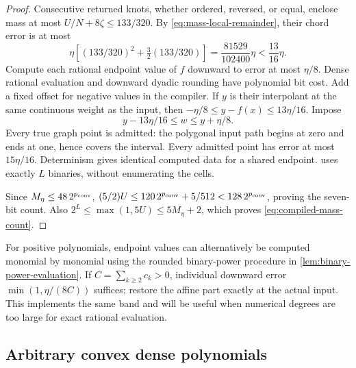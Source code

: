 \begin{proof}
Consecutive returned knots, whether ordered, reversed, or equal, enclose
mass at most $U/N+8\zeta\le133/320$. By
\eqref{eq:mass-local-remainder}, their chord error is at most
\[
 \eta\left[(133/320)^2+\tfrac32(133/320)\right]
 =\frac{81529}{102400}\eta<\frac{13}{16}\eta.
\]
Compute each rational endpoint value of $f$ downward to error at most
$\eta/8$. Dense rational evaluation and downward dyadic rounding have
polynomial bit cost. Add a fixed offset for negative values in the
compiler. If $y$ is their interpolant at the same continuous weight as
the input, then $-\eta/8\le y-f(x)\le13\eta/16$. Impose
\begin{equation}\label{eq:compiled-scalar-band}
 y-13\eta/16\le w\le y+\eta/8.
\end{equation}
Every true graph point is admitted: the polygonal input path begins
at zero and ends at one, hence covers the interval. Every admitted
point has error at most $15\eta/16$. Determinism gives identical
computed data for a shared endpoint. 
uses exactly $L$ binaries, without enumerating the cells.

Since $M_\eta\le48\,2^{p_{\mathrm{conv}}}$,
$(5/2)U\le120\,2^{p_{\mathrm{conv}}}+5/512<128\,2^{p_{\mathrm{conv}}}$, proving
the seven-bit count. Also $2^L\le\max(1,5U)\le5M_\eta+2$,
which proves \eqref{eq:compiled-mass-count}.
\end{proof}

For positive polynomials, endpoint values can alternatively be computed
monomial by monomial using the rounded binary-power procedure in
\cref{lem:binary-power-evaluation}. If $C=\sum_{k\ge2}c_k>0$,
individual downward error $\min(1,\eta/(8C))$ suffices; restore the
affine part exactly at the actual input. This implements the same band
and will be useful when numerical degrees are too large for exact
rational evaluation.

\subsection{Arbitrary convex dense polynomials}

